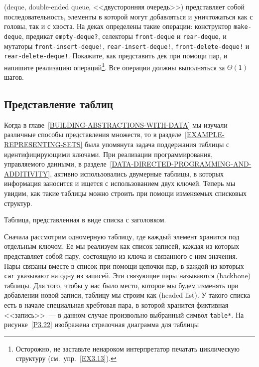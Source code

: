 \begin{exercise}{3.23}\label{EX3.23}%
 (deque, double-ended queue,
<<двусторонняя очередь>>) 
представляет собой последовательность,
элементы в которой могут добавляться и уничтожаться как с головы, так
и с хвоста.  На деках определены такие операции: конструктор
{\tt make-deque}, предикат {\tt empty-deque?}, селекторы
{\tt front-deque} и {\tt rear-deque}, и мутаторы
{\tt front-insert-deque!}, {\tt rear-insert-deque!},
{\tt front-delete-deque!} и {\tt rear-delete-deque!}.
Покажите, как представить дек при помощи пар, и напишите реализацию
операций\footnote{Осторожно, не заставьте ненароком интерпретатор
печатать циклическую структуру (см.~упр.~\ref{EX3.13}).
}.%
Все операции должны выполняться за
$\Theta(1)$ шагов.
\end{exercise}

\subsection{Представление таблиц}
\label{REPRESENTING-TABLES}


Когда в главе~\ref{BUILDING-ABSTRACTIONS-WITH-DATA} мы изучали различные
способы представления множеств, то в
разделе~\ref{EXAMPLE-REPRESENTING-SETS} была упомянута задача
поддержания 
таблицы с идентифицирующими ключами.  При реализации
программирования, управляемого данными, в
разделе~\ref{DATA-DIRECTED-PROGRAMMING-AND-ADDITIVITY}, активно
использовались двумерные таблицы, в которых информация заносится и
ищется с использованием двух ключей.  Теперь мы увидим, как такие
таблицы можно строить при помощи изменяемых списковых структур.


\begin{cntrfig}

\caption{Таблица, представленная в виде списка с
заголовком.}
\label{P3.22}

\end{cntrfig}

Сначала рассмотрим одномерную таблицу, где каждый
элемент хранится под отдельным ключом.  Ее мы реализуем как список
записей, каждая из которых представляет собой пару, состоящую из ключа
и связанного с ним значения.  Пары связаны вместе в список при помощи
цепочки пар, в каждой из которых {\tt car} указывают на одну из
записей. Эти связующие пары называются
 (backbone) таблицы. Для
того, чтобы у нас было место, которое мы будем изменять при добавлении
новой записи, таблицу мы строим как
 (headed list).  У такого списка есть в начале специальная хребтовая
пара, в которой хранится фиктивная <<запись>>~--- в данном случае
произвольно выбранный символ {\tt *table*}.  На
рисунке~\ref{P3.22} изображена стрелочная диаграмма
для таблицы

